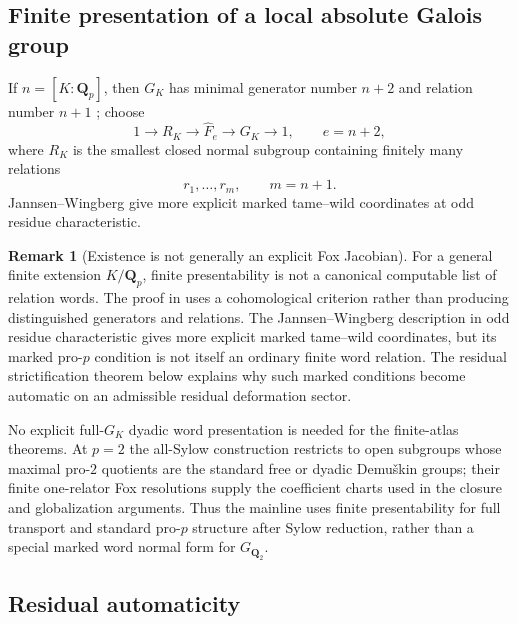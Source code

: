 \documentclass[11pt]{article}
\theoremstyle{definition}
\newtheorem{remark}[theorem]{Remark}
\newcommand{\Qp}{\mathbf Q_p}
\begin{document}
\subsection{Finite presentation of a local absolute Galois group}

If $n=[K:\Qp]$, then $G_K$ has minimal generator number $n+2$ and relation number $n+1$ \cite{JannsenWingberg,JardenShusterman,NeukirchLocal}; choose
\begin{equation}\label{eq:finite-profinite-presentation}
1\longrightarrow R_K\longrightarrow \widehat F_e
\longrightarrow G_K\longrightarrow1,
\qquad
e=n+2,
\end{equation}
where $R_K$ is the smallest closed normal subgroup containing finitely many relations
\[
r_1,\ldots,r_m,
\qquad m=n+1.
\]
Jannsen--Wingberg give more explicit marked tame--wild coordinates at odd residue characteristic.

\begin{remark}[Existence is not generally an explicit Fox Jacobian]\label{rem:nonconstructive-presentation}
For a general finite extension $K/\mathbf Q_p$, finite presentability is not a
canonical computable list of relation words.  The proof in
\cite{JardenShusterman} uses a cohomological criterion rather than producing
distinguished generators and relations.  The Jannsen--Wingberg description in
odd residue characteristic gives more explicit marked tame--wild coordinates,
but its marked pro-$p$ condition is not itself an ordinary finite word relation.
The residual strictification theorem below explains why such marked conditions
become automatic on an admissible residual deformation sector.

No explicit full-$G_K$ dyadic word presentation is needed for the finite-atlas
theorems.  At $p=2$ the all-Sylow construction restricts to open subgroups whose
maximal pro-$2$ quotients are the standard free or dyadic Demu\v{s}kin groups;
their finite one-relator Fox resolutions supply the coefficient charts used in
the closure and globalization arguments.  Thus the mainline uses finite
presentability for full transport and standard pro-$p$ structure after Sylow
reduction, rather than a special marked word normal form for $G_{\mathbf Q_2}$.
\end{remark}

\subsection{Residual automaticity}\label{subsec:marked-residual-automaticity}
\end{document}
